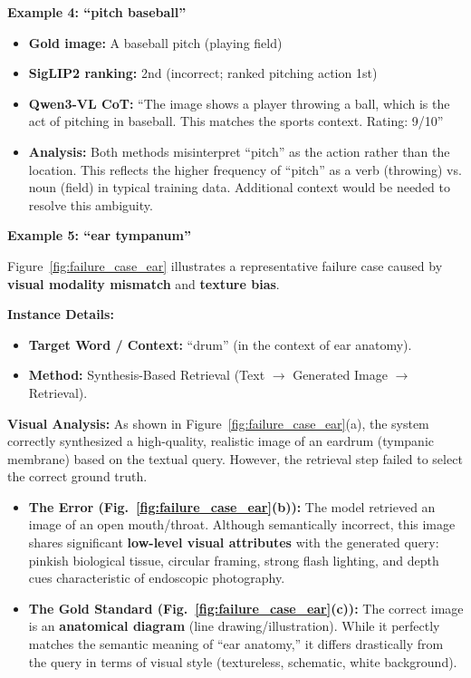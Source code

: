 \documentclass[11pt]{article}
\begin{document}
\textbf{Example 4: ``pitch baseball''}
\begin{itemize}
    \item \textbf{Gold image:} A baseball pitch (playing field)
    \item \textbf{SigLIP2 ranking:} 2nd (incorrect; ranked pitching action 1st)
    \item \textbf{Qwen3-VL CoT:} ``The image shows a player throwing a ball, which is the act of pitching in baseball. This matches the sports context. Rating: 9/10''
    \item \textbf{Analysis:} Both methods misinterpret ``pitch'' as the action rather than the location. This reflects the higher frequency of ``pitch'' as a verb (throwing) vs. noun (field) in typical training data. Additional context would be needed to resolve this ambiguity.
\end{itemize}

\textbf{Example 5: ``ear tympanum''}
\label{sec:failure_visual_mismatch}

Figure~\ref{fig:failure_case_ear} illustrates a representative failure case caused by \textbf{visual modality mismatch} and \textbf{texture bias}.

\textbf{Instance Details:}
\begin{itemize}
    \item \textbf{Target Word / Context:} ``drum'' (in the context of ear anatomy).
    \item \textbf{Method:} Synthesis-Based Retrieval (Text $\rightarrow$ Generated Image $\rightarrow$ Retrieval).
\end{itemize}

\textbf{Visual Analysis:}
As shown in Figure~\ref{fig:failure_case_ear}(a), the system correctly synthesized a high-quality, realistic image of an eardrum (tympanic membrane) based on the textual query. However, the retrieval step failed to select the correct ground truth.

\begin{itemize}
    \item \textbf{The Error (Fig.~\ref{fig:failure_case_ear}(b)):} The model retrieved an image of an open mouth/throat. Although semantically incorrect, this image shares significant \textbf{low-level visual attributes} with the generated query: pinkish biological tissue, circular framing, strong flash lighting, and depth cues characteristic of endoscopic photography.
    \item \textbf{The Gold Standard (Fig.~\ref{fig:failure_case_ear}(c)):} The correct image is an \textbf{anatomical diagram} (line drawing/illustration). While it perfectly matches the semantic meaning of ``ear anatomy,'' it differs drastically from the query in terms of visual style (textureless, schematic, white background).
\end{itemize}
\end{document}
